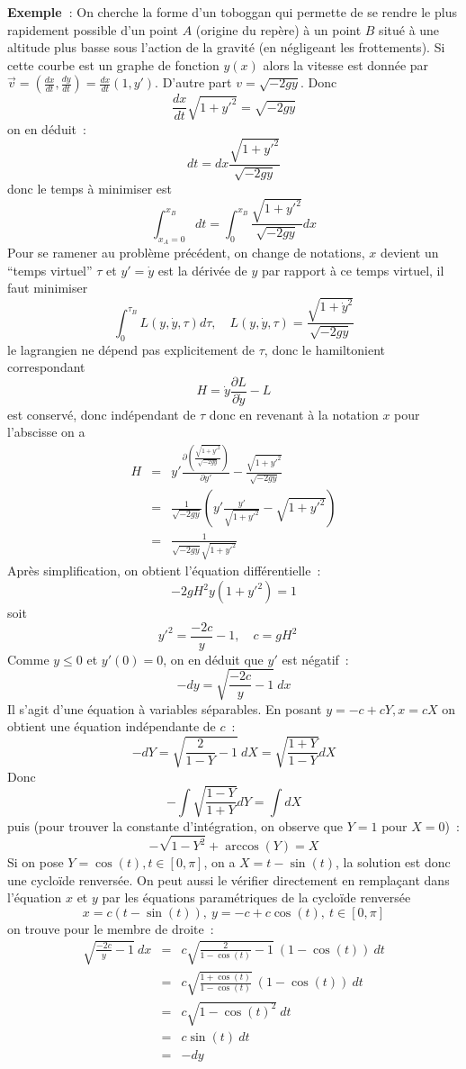 \documentclass[a4paper,11pt]{book}
\begin{document}
\begin{giacjshere}
{\bf Exemple~}: On cherche la forme d'un toboggan qui permette
de se rendre le plus rapidement possible d'un point $A$ (origine
du rep\`ere) \`a un point $B$ situ\'e \`a une altitude plus basse 
sous l'action de la gravit\'e (en n\'egligeant les frottements). 
Si cette courbe est un graphe de fonction $y(x)$ alors la vitesse
est donn\'ee par 
$\overrightarrow{v}=(\frac{dx}{dt},\frac{dy}{dt})=\frac{dx}{dt}(1,y')$.
D'autre part $v=\sqrt{-2gy}$. Donc
$$ \frac{dx}{dt}\sqrt{1+y'^2}=\sqrt{-2gy}$$
on en d\'eduit~:
$$ dt = dx \frac{\sqrt{1+y'^2}}{\sqrt{-2gy}}$$
donc le temps \`a minimiser est
$$ \int_{x_A=0}^{x_B} dt = \int_0^{x_B}
\frac{\sqrt{1+y'^2}}{\sqrt{-2gy}} dx$$
Pour se ramener au probl\`eme pr\'ec\'edent, 
on change de notations, $x$ devient un ``temps virtuel''
$\tau$ et $y'=\dot{y}$ est la d\'eriv\'ee de $y$ par
rapport \`a ce temps virtuel, il faut minimiser
$$ \int_0^{\tau_B} L(y,\dot{y},\tau) d\tau, \quad 
L(y,\dot{y},\tau)=\frac{\sqrt{1+\dot{y}^2}}{\sqrt{-2gy}} $$
le lagrangien ne d\'epend pas explicitement de $\tau$, donc le
hamiltonient correspondant
$$ H=\dot{y} \frac{\partial L}{\partial\dot{y}}  - L $$
est conserv\'e, donc ind\'ependant de $\tau$ donc en revenant
\`a la notation $x$ pour l'abscisse on a
\begin{eqnarray*}
 H&=&y'  \frac{ \partial{ \left( \frac{\sqrt{1+y'^2}}{\sqrt{-2gy}}
    \right)} }{\partial y'}- 
\frac{\sqrt{1+y'^2}}{\sqrt{-2gy}}\\
&=& \frac1 {\sqrt{-2gy}} \left( y' \frac{y'}{\sqrt{1+y'^2}} -
  \sqrt{1+y'^2} \right)\\
&=&\frac1 {\sqrt{-2gy} \sqrt{1+y'^2}} 
\end{eqnarray*}
Apr\`es simplification, on obtient l'\'equation diff\'erentielle~:
$$ -2gH^2y (1+y'^2) = 1$$
soit 
$$ y'^2=\frac{-2c}{y}-1, \quad c=gH^2\quad $$
Comme $y\leq 0$ et $y'(0)=0$, on en d\'eduit que $y'$ est n\'egatif~:
$$ -dy = \sqrt{\frac{-2c}{y}-1} \ dx$$
Il s'agit d'une \'equation \`a variables s\'eparables. En posant
$y=-c+cY, x=cX$
on obtient une \'equation ind\'ependante de $c$~:
$$ -dY=\sqrt{\frac{2}{1-Y}-1} \ dX=\sqrt{\frac{1+Y}{1-Y}} dX$$
Donc
$$ -\int \sqrt{\frac{1-Y}{1+Y}} dY = \int dX $$
puis (pour trouver la constante d'int\'egration, on observe que
$Y=1$ pour $X=0$)~:
$$ -\sqrt{1-Y^2}+\arccos(Y)=X$$
Si on pose $Y=\cos(t), t \in [0,\pi]$, on a $X=t - \sin(t)$,
la solution est donc une cyclo\"ide renvers\'ee.
On peut aussi le v\'erifier directement
en rempla\c{c}ant dans l'\'equation $x$ et $y$
par les \'equations param\'etriques de la cyclo\"ide renvers\'ee
$$x=c(t-\sin(t)), \ y=-c+c\cos(t), \ t \in [0,\pi]$$
on trouve pour le membre de droite~:
\begin{eqnarray*}
\sqrt{\frac{-2c}{y}-1} \ dx &=& c \sqrt{\frac{2}{1-\cos(t)}-1} \ 
(1-\cos(t)) \ dt\\
&=& c \sqrt{\frac{1+\cos(t)}{1-\cos(t)}} \  (1-\cos(t)) \ dt \\
&=& c \sqrt{1-\cos(t)^2} \ dt\\
&=& c \sin(t) \ dt \\
&=& -dy
\end{eqnarray*}


\end{giacjshere}
\end{document}
